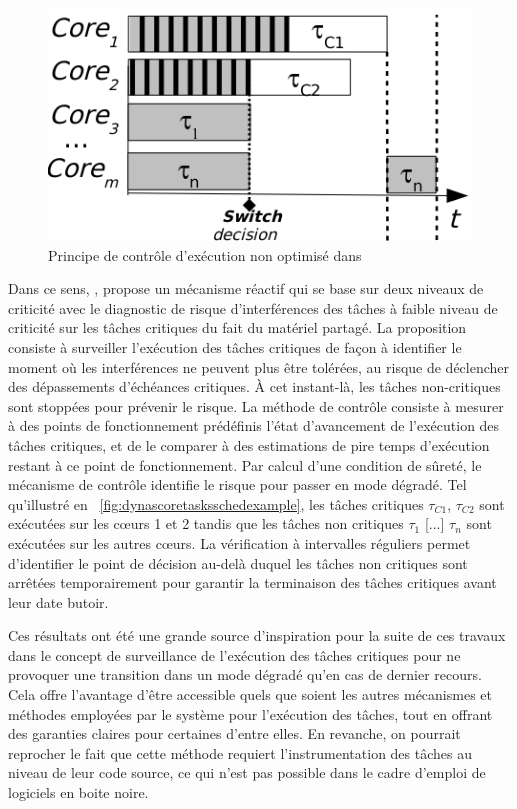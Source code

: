 \documentclass[french, a4paper, 11pt, twoside, pdftex]{StyleThese}
\begin{document}
    \begin{figure}[ht!]
    	\centering
    	\includegraphics[width=0.7\linewidth]{schemas/DYNASCORE_tasks_sched_example}
    	\caption{Principe de contrôle d'exécution non optimisé dans \cite{kritikakou_multiplexing_2016}}
    	\label{fig:dynascoretasksschedexample}
    \end{figure}
    Dans ce sens, \cite{kritikakou_distributed_2014}, \cite{kritikakou_dynascore_2017} propose un mécanisme réactif qui se base sur deux niveaux de criticité avec le diagnostic de risque d'interférences des tâches à faible niveau de criticité sur les tâches critiques du fait du matériel partagé. La proposition consiste à surveiller l'exécution des tâches critiques de façon à identifier le moment où les interférences ne peuvent plus être tolérées, au risque de déclencher des dépassements d'échéances critiques. À cet instant-là, les tâches non-critiques sont stoppées pour prévenir le risque. La méthode de contrôle consiste à mesurer à des points de fonctionnement prédéfinis l'état d'avancement de l'exécution des tâches critiques, et de le comparer à des estimations de pire temps d'exécution restant à ce point de fonctionnement. Par calcul d'une condition de sûreté, le mécanisme de contrôle identifie le risque  pour passer en mode dégradé. Tel qu'illustré en ~\autoref{fig:dynascoretasksschedexample}, les tâches critiques $\tau_{C1}$, $\tau_{C2}$ sont exécutées sur les cœurs 1 et 2 tandis que les tâches non critiques $\tau_{1}$ [...] $\tau_{n}$ sont exécutées sur les autres cœurs. La vérification à intervalles réguliers permet d'identifier le point de décision au-delà duquel les tâches non critiques sont arrêtées temporairement pour garantir la terminaison des tâches critiques avant leur date butoir.
    

    
    Ces résultats ont été une grande source d'inspiration pour la suite de ces travaux dans le concept de surveillance de l'exécution des tâches critiques pour ne provoquer une transition dans un mode dégradé qu'en cas de dernier recours. Cela offre l'avantage d'être accessible quels que soient les autres mécanismes et méthodes employées par le système pour l'exécution des tâches, tout en offrant des garanties claires pour certaines d'entre elles. En revanche, on pourrait reprocher le fait que cette méthode requiert l'instrumentation des tâches au niveau de leur code source, ce qui n'est pas possible dans le cadre d'emploi de logiciels en boite noire.
\end{document}
